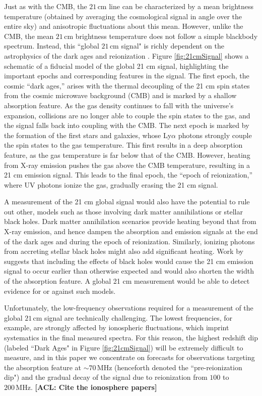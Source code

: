 \documentclass[twocolumn,apj,numberedappendix]{emulateapj}
\newcommand{\acl}[1]{{\color{red} \textbf{[ACL:  #1]}}}
\begin{document}
Just as with the CMB, the $21\,\textrm{cm}$ line can be characterized by a mean brightness temperature (obtained by averaging the cosmological signal in angle over the entire sky) and anisotropic fluctuations about this mean. However, unlike the CMB, the mean $21\,\textrm{cm}$ brightness temperature does not follow a simple blackbody spectrum. Instead, this ``global $21\,\textrm{cm}$ signal" is richly dependent on the astrophysics of the dark ages and reionization \citep{Shaver1999,PritchardLoeb2010}. Figure \ref{fig:21cmSignal} shows a schematic of a fiducial model of the global 21 cm signal, highlighting the important epochs and corresponding features in the signal. The first epoch, the cosmic ``dark ages,'' arises with the thermal decoupling of the 21 cm spin states from the cosmic microwave background (CMB) and is marked by a shallow absorption feature. As the gas density continues to fall with the universe's expansion, collisions are no longer able to couple the spin states to the gas, and the signal falls back into coupling with the CMB. The next epoch is marked by the formation of the first stars and galaxies, whose Ly$\alpha$ photons strongly couple the spin states to the gas temperature. This first results in a deep absorption feature, as the gas temperature is far below that of the CMB. However, heating from X-ray emission pushes the gas above the CMB temperature, resulting in a 21 cm emission signal. This leads to the final epoch, the ``epoch of reionization,'' where UV photons ionize the gas, gradually erasing the 21 cm signal.

A measurement of the 21 cm global signal would also have the potential to rule out other, models such as those involving dark matter annihilations or stellar black holes. Dark matter annihilation scenarios provide heating beyond that from X-ray emission, and hence dampen the absorption and emission signals at the end of the dark ages and during the epoch of reionization. \citep{Valdes2013_DM} Similarly, ionizing photons from accreting stellar black holes might also add significant heating. Work by \citet{Mirabel_stellar_bh} suggests that including the effects of black holes would cause the 21 cm emission signal to occur earlier than otherwise expected and would also shorten the width of the absorption feature. A global 21 cm measurement would be able to detect evidence for or against such models.

Unfortunately, the low-frequency observations required for a measurement of the global $21\,\textrm{cm}$ signal are technically challenging. The lowest frequencies, for example, are strongly affected by ionospheric fluctuations, which imprint systematics in the final measured spectra. For this reason, the 
highest redshift dip (labeled ``Dark Ages" in Figure \ref{fig:21cmSignal}) will be extremely difficult to measure, and in this paper we concentrate on forecasts for observations targeting the absorption feature at $\sim 70 \,\textrm{MHz}$ (henceforth denoted the ``pre-reionization dip") and the gradual decay of the signal due to reionization from $100$ to $200\,\textrm{MHz}$. \acl{Cite the ionosphere papers}
\end{document}
